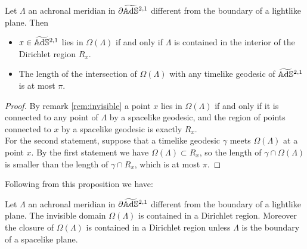 \begin{proposition}\label{prop:invisible1}
    Let $\Lambda$ an achronal meridian in $\partial\widetilde{\mathbb{A}\mathrm{d}\mathbb{S}}{}^{2,1}$ different from the boundary of a lightlike plane. Then
    \begin{itemize}
        \item $x \in \widetilde{\mathbb{A}\mathrm{d}\mathbb{S}}{}^{2,1}$ lies in $\Omega(\Lambda)$ if and only if $\Lambda$ is contained in the interior of the Dirichlet region $R_x$.
        \item The length of the intersection of $\Omega(\Lambda)$ with any timelike geodesic of $\widetilde{\mathbb{A}\mathrm{d}\mathbb{S}}{}^{2,1}$ is at most $\pi$.
    \end{itemize}
\end{proposition}
\begin{proof}
    By remark \ref{rem:invisible} a point $x$ lies in $\Omega(\Lambda)$ if and only if it is connected to any point of $\Lambda$ by a spacelike geodesic, and the region of points connected to $x$ by a spacelike geodesic is exactly $R_x$.\\
    For the second statement, suppose that a timelike geodesic $\gamma$ meets $\Omega(\Lambda)$ at a point $x$. 
    By the first statement we have $\Omega (\Lambda) \subset R_x$, so the length of $\gamma \cap \Omega (\Lambda)$ is smaller than the length of $\gamma \cap R_x$, which is at most $\pi$.
\end{proof}

Following from this proposition we have:
\begin{proposition} \label{prop:invisible2}
    Let $\Lambda$ an achronal meridian in $\partial\widetilde{\mathbb{A}\mathrm{d}\mathbb{S}}{}^{2,1}$ different from the boundary of a lightlike plane. The invisible domain $\Omega(\Lambda)$ is contained in a Dirichlet region. Moreover the closure of $\Omega(\Lambda)$ is contained in a Dirichlet region unless $\Lambda$ is the boundary of a spacelike plane.
\end{proposition}

